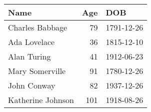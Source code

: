 \begin{table}[H]
\centering
\begin{tabular}{lrl}
\toprule
Name & Age & DOB\\
\midrule
\rowcolor{gray!6}  Charles Babbage & 79 & 1791-12-26\\
Ada Lovelace & 36 & 1815-12-10\\
\rowcolor{gray!6}  Alan Turing & 41 & 1912-06-23\\
Mary Somerville & 91 & 1780-12-26\\
\rowcolor{gray!6}  John Conway & 82 & 1937-12-26\\
\addlinespace
Katherine Johnson & 101 & 1918-08-26\\
\bottomrule
\end{tabular}
\end{table}